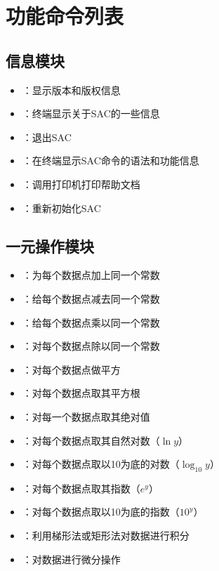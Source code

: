 \section*{功能命令列表}

\subsection*{信息模块}
\begin{itemize}
\item {}：显示版本和版权信息
\item {}：终端显示关于SAC的一些信息
\item {}：退出SAC
\item {}：在终端显示SAC命令的语法和功能信息
\item {}：调用打印机打印帮助文档
\item {}：重新初始化SAC
\end{itemize}

\subsection*{一元操作模块}
\begin{itemize}
\item {}：为每个数据点加上同一个常数
\item {}：给每个数据点减去同一个常数
\item {}：给每个数据点乘以同一个常数
\item {}：对每个数据点除以同一个常数
\item {}：对每个数据点做平方
\item {}：对每个数据点取其平方根
\item {}：对每一个数据点取其绝对值
\item {}：对每个数据点取其自然对数（$\ln y$）
\item {}：对每个数据点取以10为底的对数（$\log_{10} y$）
\item {}：对每个数据点取其指数（$e^y$）
\item {}：对每个数据点取以10为底的指数（$10^y$）
\item {}：利用梯形法或矩形法对数据进行积分
\item {}：对数据进行微分操作
\end{itemize}

